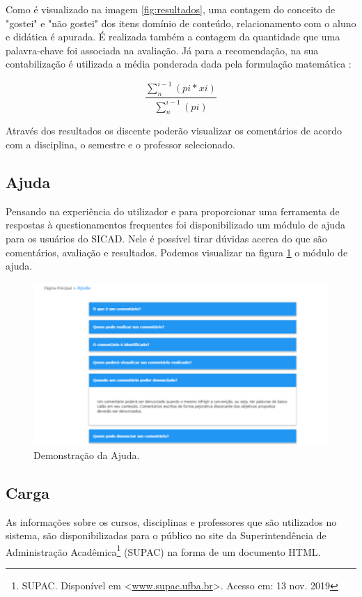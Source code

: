 \documentclass[12pt, a4paper]{report}
\begin{document}
Como é visualizado na imagem \ref{fig:resultados}, uma contagem do conceito de "gostei" e "não gostei" dos itens domínio de conteúdo, relacionamento com o aluno e didática é apurada. É realizada também a contagem da quantidade que uma palavra-chave foi associada na avaliação. Já para a recomendação, na sua contabilização é utilizada a média ponderada dada pela formulação matemática :

\begin{equation}
\frac{\sum_{n}^{i-1}(pi*xi)}{\sum_{n}^{i-1}(pi)} 
\end{equation}

Através dos resultados os discente poderão visualizar os comentários de acordo com a disciplina, o semestre e o professor selecionado.

\subsection{Ajuda}

Pensando na experiência do utilizador e para proporcionar uma ferramenta de respostas à questionamentos frequentes foi disponibilizado um módulo de ajuda para os usuários do SICAD.
Nele é possível tirar dúvidas acerca do que são comentários, avaliação e resultados. Podemos visualizar na figura \ref{fig:ajuda} o módulo de ajuda.

\begin{figure}
\centering
\includegraphics[scale=0.9]{ajuda.png}
\caption{Demonstração da Ajuda.}
\label{fig:ajuda}
\end{figure}

\subsection{Carga}
As informações sobre os cursos, disciplinas e professores que são utilizados no sistema, são disponibilizadas para o público no site da Superintendência de Administração Acadêmica\footnote{SUPAC. Disponível em <\url{www.supac.ufba.br}>. Acesso em: 13 nov. 2019} (SUPAC) na forma de um documento HTML.
\end{document}
